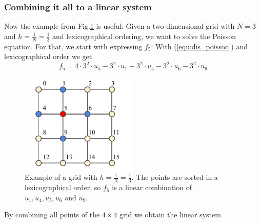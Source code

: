 \subsubsection*{Combining it all to a linear system}
Now the example from Fig.\ref{fig:nat_order_2} is useful: Given a two-dimensional grid with $N = 3$ and $h = \frac{1}{N} = \frac{1}{3}$ and lexicographical ordering, we want to solve the Poisson equation. For that, we start with expressing $f_5$: With (\ref{equ:dis_poisson}) and lexicographical order we get 
\begin{equation}
f_5 = 4 \cdot 3^2 \cdot u_5 - 3^2 \cdot u_1 - 3^2 \cdot u_4  - 3^2 \cdot u_6 - 3^2 \cdot u_9
\end{equation}






\begin{figure}[h]
	\centering
	\includegraphics[width=0.5\textwidth]{chapters/chapter01/linear_order_2.pdf}
	\caption{Example of a grid with $h=\frac{1}{N} = \frac{1}{3}$. The points are sorted in a lexicographical order, so $f_5$ is a linear combination of $u_1, u_4, u_5, u_6 \textrm{ and } u_9$.}
	\label{fig:nat_order_2}
\end{figure}



By combining all points of the $4\times 4$ grid we obtain the linear system \cite{schwed}

